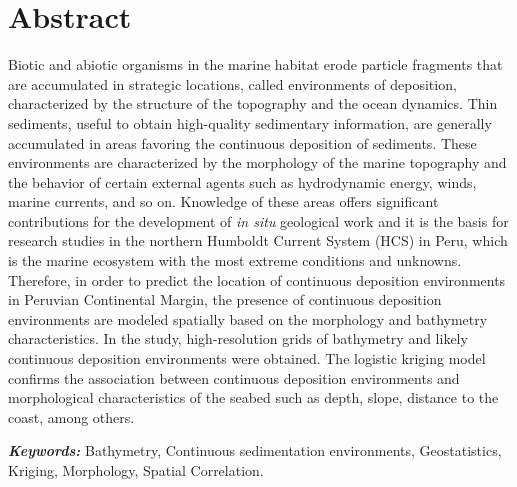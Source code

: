 {\centering \section*{Abstract}}
Biotic and abiotic organisms in the marine habitat erode particle fragments that are accumulated in strategic locations, called environments of deposition,  characterized by the structure of the topography and the ocean dynamics. Thin sediments, useful  to obtain high-quality sedimentary information, are generally accumulated in areas favoring the continuous deposition of sediments. These environments are characterized by the morphology of the marine topography and the behavior of certain external agents such as hydrodynamic energy, winds, marine currents, and so on. Knowledge of these areas offers significant contributions for the development of \textit{in situ} geological work and it is the basis for research studies in the northern Humboldt Current System (HCS) in Peru, which is the marine ecosystem with the most extreme conditions and unknowns. Therefore, in order to predict the location of continuous deposition environments in Peruvian Continental Margin, the presence of continuous deposition environments are modeled  spatially  based on the morphology and bathymetry characteristics. In the study, high-resolution grids of bathymetry and likely continuous deposition environments were obtained. The logistic  kriging model confirms the association between continuous deposition environments and morphological characteristics of the seabed such as depth, slope, distance to the coast, among others.

\noindent\textbf{\textit{Keywords:}} Bathymetry, Continuous sedimentation environments, Geostatistics, Kriging, Morphology, Spatial Correlation.\\
